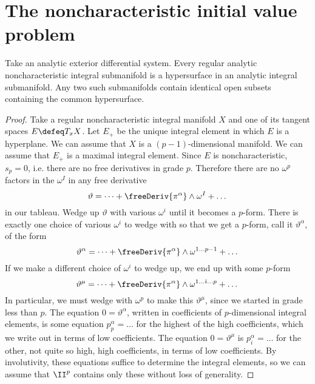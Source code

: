\section{The noncharacteristic initial value problem}
\begin{theorem}%
\label{theorem:CKI}%
%
Take an analytic exterior differential system.
Every regular analytic noncharacteristic integral submanifold is a hypersurface in an analytic integral submanifold.
Any two such submanifolds contain identical open subsets containing the common hypersurface.
\end{theorem}
\begin{proof}
Take a regular noncharacteristic integral manifold \(X\) and one of its tangent spaces \(E\defeq T_x X\).
Let \(E_+\) be the unique integral element in which \(E\) is a hyperplane.
We can assume that \(X\) is a \((p-1)\)-dimensional manifold.
We can assume that \(E_+\) is a maximal integral element.
Since \(E\) is noncharacteristic, \(s_p=0\), i.e. there are no free derivatives in grade \(p\).
Therefore there are no \(\omega^p\) factors in the \(\omega^I\) in any free derivative
\[
\vartheta = \dots + \freeDeriv{\pi^{\alpha}} \wedge \omega^I + \dots
\]
in our tableau.
Wedge up \(\vartheta\) with various \(\omega^i\) until it becomes a \(p\)-form.
There is exactly one choice of various \(\omega^i\) to wedge with so that we get a \(p\)-form, call it \(\vartheta^{\alpha}\), of the form 
\[
\vartheta^{\alpha} = \dots + \freeDeriv{\pi^{\alpha}} \wedge \omega^{1\dots p-1} + \dots
\]
If we make a different choice of \(\omega^i\) to wedge up, we end up with some \(p\)-form
\[
\vartheta^{\mu} = \dots + \freeDeriv{\pi^{\alpha}} \wedge \omega^{1\dots \hat\imath \dots p} + \dots
\]
In particular, we must wedge with \(\omega^p\) to make this \(\vartheta^{\mu}\), since we started in grade less than \(p\).
The equation \(0=\vartheta^{\alpha}\), written in coefficients of \(p\)-dimensional integral elements, is some equation \(p^{\alpha}_p=\dots\) for the highest of the high coefficients, which we write out in terms of low coefficients.
The equation \(0=\vartheta^{\mu}\) is \(p^{\alpha}_i=\dots\) for the other, not quite so high, high coefficients, in terms of low coefficients.
By involutivity, these equations suffice to determine the integral elements, so we can assume that \(\II^p\) contains only these without loss of generality.


\end{proof}
